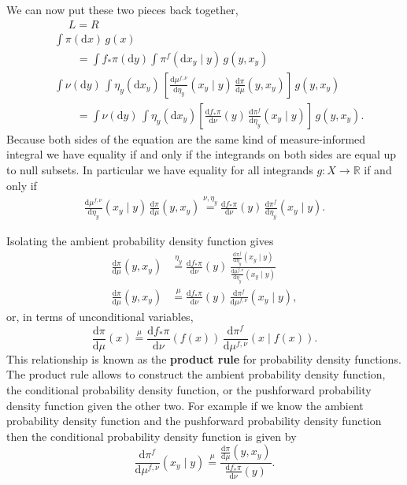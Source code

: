 \documentclass[
  letterpaper,
  DIV=11,
  numbers=noendperiod]{scrartcl}
\begin{document}
We can now put these two pieces back together, \begin{align*}
&
\quad\; L = R
\\
&
\int \pi( \mathrm{d} x ) \, g(x)
\\
&\quad\quad=
\int f_{*} \pi (\mathrm{d} y)
\int \pi^{f}( \mathrm{d}x_{y} \mid y ) \, g(y, x_{y})
\\
&
\int \nu ( \mathrm{d} y ) \,
\int \eta_{y} ( \mathrm{d} x_{y} ) \,
\left[ \frac{ \mathrm{d} \mu^{f, \nu}}{ \mathrm{d} \eta_{y} }(x_{y} \mid y) \,
\frac{ \mathrm{d} \pi}{ \mathrm{d} \mu }(y, x_{y}) \right] \, g(y, x_{y})
\\
&\quad\quad=
\int \nu (\mathrm{d} y) \,
\int \eta_{y} ( \mathrm{d}x_{y} )
\left[ \frac{ \mathrm{d}  f_{*} \pi }{ \mathrm{d}  \nu  }(y)
       \, \frac{ \mathrm{d} \pi^{f}}{ \mathrm{d} \eta_{y} }(x_{y} \mid y) \right] \, g(y, x_{y}).
\end{align*} Because both sides of the equation are the same kind of
measure-informed integral we have equality if and only if the integrands
on both sides are equal up to null subsets. In particular we have
equality for all integrands \(g : X \rightarrow \mathbb{R}\) if and only
if \begin{align*}
\frac{ \mathrm{d} \mu^{f, \nu}}{ \mathrm{d} \eta_{y} }(x_{y} \mid y) \,
\frac{ \mathrm{d} \pi}{ \mathrm{d} \mu }(y, x_{y})
\overset{ \nu, \eta_{y} }{ = }
\frac{ \mathrm{d}  f_{*} \pi }{ \mathrm{d}  \nu  }(y) \, \frac{ \mathrm{d} \pi^{f}}{ \mathrm{d} \eta_{y} }(x_{y} \mid y).
\end{align*}

Isolating the ambient probability density function gives \begin{align*}
\frac{ \mathrm{d} \pi}{ \mathrm{d} \mu }(y, x_{y})
&\overset{ \eta_{y} }{ = }
\frac{ \mathrm{d}  f_{*} \pi }{ \mathrm{d} \nu }(y) \,
\frac{ \frac{ \mathrm{d}  \pi^{f} }{ \mathrm{d}  \eta_{y}  } (x_{y} \mid y) }
{ \frac{ \mathrm{d}  \mu^{f, \nu} }{ \mathrm{d}  \eta_{y}  } (x_{y} \mid y) }
\\
\frac{ \mathrm{d} \pi}{ \mathrm{d} \mu }(y, x_{y})
&\overset{ \mu }{ = }
\frac{ \mathrm{d}  f_{*} \pi }{ \mathrm{d} \nu }(y) \,
\frac{ \mathrm{d}  \pi^{f} }{ \mathrm{d}  \mu^{f, \nu}  } (x_{y} \mid y),
\end{align*} or, in terms of unconditional variables, \[
\frac{ \mathrm{d} \pi}{ \mathrm{d} \mu }(x)
\overset{ \mu }{ = }
\frac{ \mathrm{d}  f_{*} \pi }{ \mathrm{d} \nu }(f(x)) \,
\frac{ \mathrm{d}  \pi^{f} }{ \mathrm{d}  \mu^{f, \nu}  } (x \mid f(x)).
\] This relationship is known as the \textbf{product rule} for
probability density functions. The product rule allows to construct the
ambient probability density function, the conditional probability
density function, or the pushforward probability density function given
the other two. For example if we know the ambient probability density
function and the pushforward probability density function then the
conditional probability density function is given by \[
\frac{ \mathrm{d}  \pi^{f} }{ \mathrm{d}  \mu^{f, \nu}  } (x_{y} \mid y)
\overset{ \mu }{ = }
\frac{ \frac{ \mathrm{d} \pi}{ \mathrm{d} \mu }(y, x_{y}) }{ \frac{ \mathrm{d}  f_{*} \pi }{ \mathrm{d} \nu }(y) }.
\]
\end{document}
